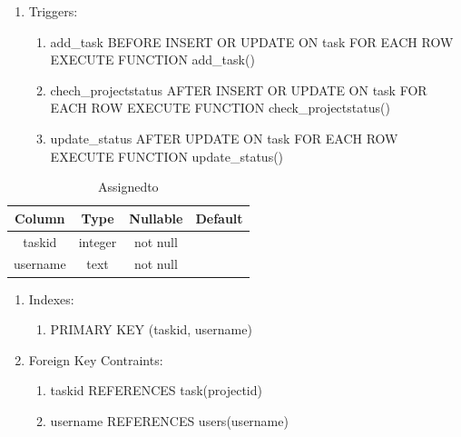 \documentclass[conference,onecolumn]{IEEEtran}
\begin{document}
\begin{table}[htbp]
\begin{center}
\begin{enumerate}
    \item Triggers:
      \begin{enumerate}
        \item add\_task BEFORE INSERT OR UPDATE ON task FOR EACH ROW EXECUTE FUNCTION add\_task()
        \item chech\_projectstatus AFTER INSERT OR UPDATE ON task FOR EACH ROW EXECUTE FUNCTION check\_projectstatus()
        \item update\_status AFTER UPDATE ON task FOR EACH ROW EXECUTE FUNCTION update\_status()
      \end{enumerate}
    \end{enumerate}
    \label{task}
  \end{center}
\end{table}

\begin{table}[htbp]
  \caption{Assignedto}
  \begin{center}
    \begin{tabular}{|c|c|c|c|}
      \hline
      \textbf{Column} & \textbf{Type} & \textbf{Nullable} & \textbf{Default}\\
      \hline
      taskid & integer & not null &\\
      username & text & not null &\\
      \hline
    \end{tabular}
    \begin{enumerate}
    \item Indexes:
      \begin{enumerate}
      \item PRIMARY KEY (taskid, username)
      \end{enumerate}
    \item Foreign Key Contraints:
      \begin{enumerate}
      \item taskid REFERENCES task(projectid)
      \item username REFERENCES users(username)
      \end{enumerate}
    \end{enumerate}
    \label{assignedto}
  \end{center}
\end{table}
\end{document}

